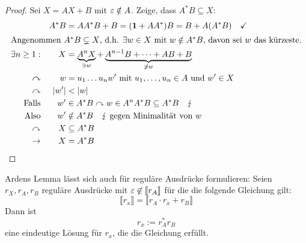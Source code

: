 \begin{proof}
Sei $ X= AX+B$ mit $\varepsilon\notin A$. Zeige, dass $A^*B \subseteq X$:
        \begin{alignat*}{3}
                && A^*B &= AA^*B + B = (\1+AA^*)B = B+A(A^*B) \quad\checkmark\\
                \shortintertext{Angenommen $A^*B \subsetneq X$, d.h. $\exists w\in X$ mit $w\notin A^*B$, davon sei $w$ das kürzeste.}
                \exists n\geq 1: && X &= \underbrace{A^nX}_{\ni w} + \underbrace{A^{n-1}B+\dots +AB+B}_{\not\ni w}\\
                \curvearrowright && w &= u_1\dots u_n w'\text{ mit } u_1,\dots,u_n\in A\text{ und } w'\in X\\
                \curvearrowright && |w'| &< |w|\\
                \text{Falls}&& w'&\in A^*B \curvearrowright w\in A^nA^*B\subseteq A^*B \quad \lightning\\
                \text{Also} && w'&\notin A^*B \quad\lightning\text{ gegen Minimalität von }w\\
                \curvearrowright && X&\subseteq A^*B\\
                \-> && X &= A^*B \tag*{\qedhere}
        \end{alignat*}
\end{proof}

\begin{Korollar}
  Ardens Lemma lässt sich auch für reguläre Ausdrücke formulieren: Seien $r_X,r_A,r_B$ reguläre Ausdrücke mit $\varepsilon \not \in \llbracket r_A \rrbracket$ für die die folgende Gleichung gilt:
  \begin{displaymath}
    \llbracket r_x \rrbracket = \llbracket r_A \cdot r_x + r_B \rrbracket
  \end{displaymath}
  Dann ist 
  \begin{displaymath}
    r_x := r_A^*r_B
  \end{displaymath}
  eine eindeutige Lösung für $r_x$, die die Gleichung erfüllt.
\end{Korollar}


